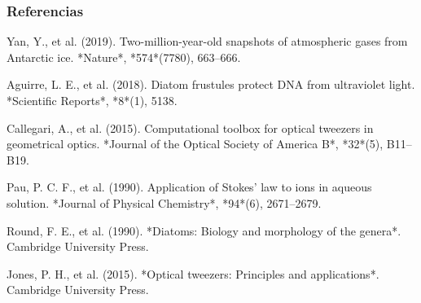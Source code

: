 \documentclass[10pt,aspectratio=1610,compress,dvipsnames]{beamer}
\begin{document}
\begin{frame}
\frametitle{Referencias}
\small
\setlength{\parskip}{6pt}

\begin{flushleft}
Yan, Y., et al. (2019). Two-million-year-old snapshots of atmospheric gases from Antarctic ice. *Nature*, *574*(7780), 663–666.


Aguirre, L. E., et al. (2018). Diatom frustules protect DNA from ultraviolet light. *Scientific Reports*, *8*(1), 5138.


Callegari, A., et al. (2015). Computational toolbox for optical tweezers in geometrical optics. *Journal of the Optical Society of America B*, *32*(5), B11–B19.


Pau, P. C. F., et al. (1990). Application of Stokes' law to ions in aqueous solution. *Journal of Physical Chemistry*, *94*(6), 2671–2679.


Round, F. E., et al. (1990). *Diatoms: Biology and morphology of the genera*. Cambridge University Press.


Jones, P. H., et al. (2015). *Optical tweezers: Principles and applications*. Cambridge University Press.
\end{flushleft}
\end{frame}
\end{document}
